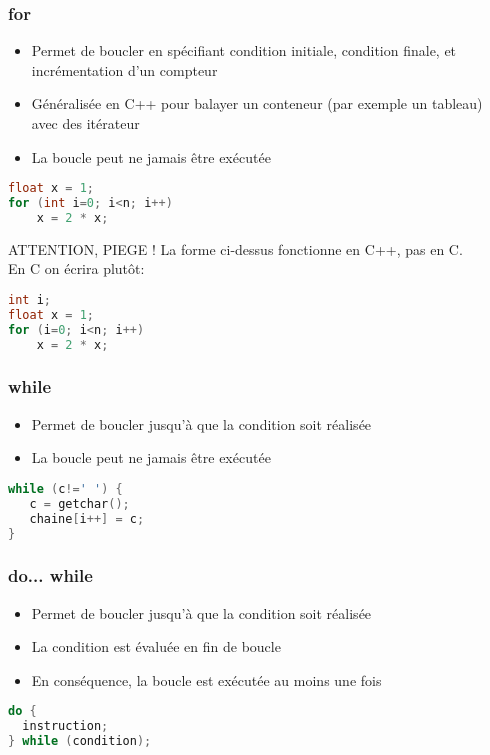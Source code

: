 \documentclass{beamer}
\begin{document}
\begin{frame}[fragile=singleslide,shrink=20]
\frametitle {for}
\begin{itemize}
\item{Permet de boucler en spécifiant condition initiale, condition finale, et incrémentation d'un compteur}
\item{Généralisée en C++ pour balayer un conteneur (par exemple un tableau) avec des itérateur}
\item{La boucle peut ne jamais être exécutée}
\end{itemize}
\begin{lstlisting}[language=c++]
float x = 1;
for (int i=0; i<n; i++)
    x = 2 * x;
\end{lstlisting}
\begin{block}{ATTENTION, PIEGE !}
La forme ci-dessus fonctionne en C++, pas en C. \\
En C on écrira plutôt:
\begin{lstlisting}[language=c++]
int i;
float x = 1;
for (i=0; i<n; i++)
    x = 2 * x;
\end{lstlisting}
\end{block}
\end{frame}

\begin{frame}[fragile=singleslide,shrink=20]
\frametitle {while}
\begin{itemize}
\item{Permet de boucler jusqu'à que la condition soit réalisée}
\item{La boucle peut ne jamais être exécutée}
\end{itemize}
\begin{lstlisting}[language=c++]
while (c!=' ') {
   c = getchar();
   chaine[i++] = c;
}
\end{lstlisting}
\end{frame}

\begin{frame}[fragile=singleslide,shrink=20]
\frametitle {do... while}
\begin{itemize}
\item{Permet de boucler jusqu'à que la condition soit réalisée}
\item{La condition est évaluée en fin de boucle}
\item{En conséquence, la boucle est exécutée au moins une fois}
\end{itemize}
\begin{lstlisting}[language=c++]
do {
  instruction;
} while (condition);
\end{lstlisting}
\end{frame}
\end{document}
